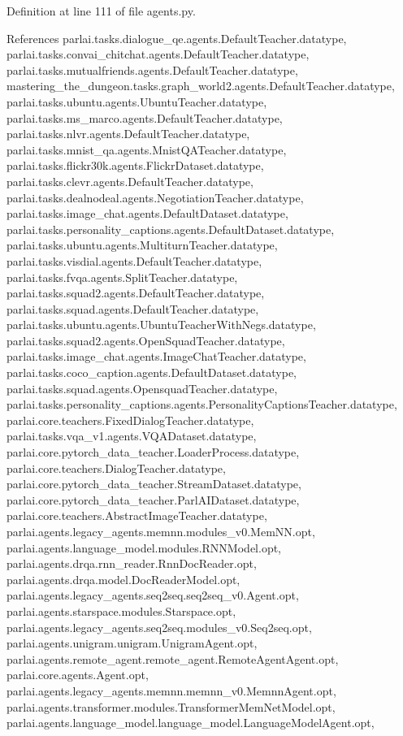 Definition at line 111 of file agents.\+py.



References parlai.\+tasks.\+dialogue\+\_\+qe.\+agents.\+Default\+Teacher.\+datatype, parlai.\+tasks.\+convai\+\_\+chitchat.\+agents.\+Default\+Teacher.\+datatype, parlai.\+tasks.\+mutualfriends.\+agents.\+Default\+Teacher.\+datatype, mastering\+\_\+the\+\_\+dungeon.\+tasks.\+graph\+\_\+world2.\+agents.\+Default\+Teacher.\+datatype, parlai.\+tasks.\+ubuntu.\+agents.\+Ubuntu\+Teacher.\+datatype, parlai.\+tasks.\+ms\+\_\+marco.\+agents.\+Default\+Teacher.\+datatype, parlai.\+tasks.\+nlvr.\+agents.\+Default\+Teacher.\+datatype, parlai.\+tasks.\+mnist\+\_\+qa.\+agents.\+Mnist\+Q\+A\+Teacher.\+datatype, parlai.\+tasks.\+flickr30k.\+agents.\+Flickr\+Dataset.\+datatype, parlai.\+tasks.\+clevr.\+agents.\+Default\+Teacher.\+datatype, parlai.\+tasks.\+dealnodeal.\+agents.\+Negotiation\+Teacher.\+datatype, parlai.\+tasks.\+image\+\_\+chat.\+agents.\+Default\+Dataset.\+datatype, parlai.\+tasks.\+personality\+\_\+captions.\+agents.\+Default\+Dataset.\+datatype, parlai.\+tasks.\+ubuntu.\+agents.\+Multiturn\+Teacher.\+datatype, parlai.\+tasks.\+visdial.\+agents.\+Default\+Teacher.\+datatype, parlai.\+tasks.\+fvqa.\+agents.\+Split\+Teacher.\+datatype, parlai.\+tasks.\+squad2.\+agents.\+Default\+Teacher.\+datatype, parlai.\+tasks.\+squad.\+agents.\+Default\+Teacher.\+datatype, parlai.\+tasks.\+ubuntu.\+agents.\+Ubuntu\+Teacher\+With\+Negs.\+datatype, parlai.\+tasks.\+squad2.\+agents.\+Open\+Squad\+Teacher.\+datatype, parlai.\+tasks.\+image\+\_\+chat.\+agents.\+Image\+Chat\+Teacher.\+datatype, parlai.\+tasks.\+coco\+\_\+caption.\+agents.\+Default\+Dataset.\+datatype, parlai.\+tasks.\+squad.\+agents.\+Opensquad\+Teacher.\+datatype, parlai.\+tasks.\+personality\+\_\+captions.\+agents.\+Personality\+Captions\+Teacher.\+datatype, parlai.\+core.\+teachers.\+Fixed\+Dialog\+Teacher.\+datatype, parlai.\+tasks.\+vqa\+\_\+v1.\+agents.\+V\+Q\+A\+Dataset.\+datatype, parlai.\+core.\+pytorch\+\_\+data\+\_\+teacher.\+Loader\+Process.\+datatype, parlai.\+core.\+teachers.\+Dialog\+Teacher.\+datatype, parlai.\+core.\+pytorch\+\_\+data\+\_\+teacher.\+Stream\+Dataset.\+datatype, parlai.\+core.\+pytorch\+\_\+data\+\_\+teacher.\+Parl\+A\+I\+Dataset.\+datatype, parlai.\+core.\+teachers.\+Abstract\+Image\+Teacher.\+datatype, parlai.\+agents.\+legacy\+\_\+agents.\+memnn.\+modules\+\_\+v0.\+Mem\+N\+N.\+opt, parlai.\+agents.\+language\+\_\+model.\+modules.\+R\+N\+N\+Model.\+opt, parlai.\+agents.\+drqa.\+rnn\+\_\+reader.\+Rnn\+Doc\+Reader.\+opt, parlai.\+agents.\+drqa.\+model.\+Doc\+Reader\+Model.\+opt, parlai.\+agents.\+legacy\+\_\+agents.\+seq2seq.\+seq2seq\+\_\+v0.\+Agent.\+opt, parlai.\+agents.\+starspace.\+modules.\+Starspace.\+opt, parlai.\+agents.\+legacy\+\_\+agents.\+seq2seq.\+modules\+\_\+v0.\+Seq2seq.\+opt, parlai.\+agents.\+unigram.\+unigram.\+Unigram\+Agent.\+opt, parlai.\+agents.\+remote\+\_\+agent.\+remote\+\_\+agent.\+Remote\+Agent\+Agent.\+opt, parlai.\+core.\+agents.\+Agent.\+opt, parlai.\+agents.\+legacy\+\_\+agents.\+memnn.\+memnn\+\_\+v0.\+Memnn\+Agent.\+opt, parlai.\+agents.\+transformer.\+modules.\+Transformer\+Mem\+Net\+Model.\+opt, parlai.\+agents.\+language\+\_\+model.\+language\+\_\+model.\+Language\+Model\+Agent.\+opt, 